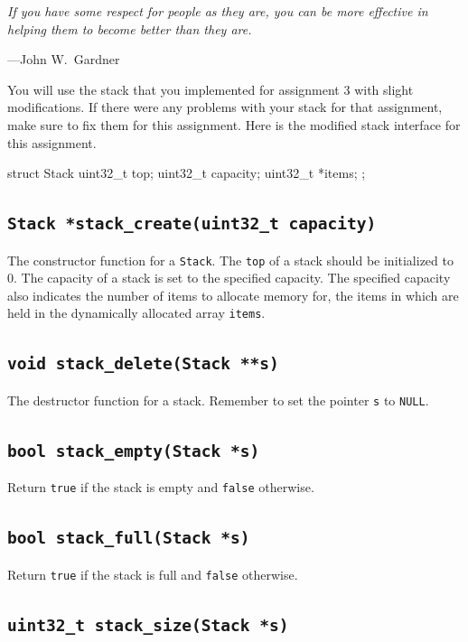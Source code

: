 \documentclass[11pt]{article}
\begin{document}
\textwidth \epigraph{\emph{If you have some respect
for people as they are, you can be more effective in helping them to
become better than they are.}}{---John W.\ Gardner}

You will use the stack that you implemented for assignment 3 with slight
modifications. If there were any problems with your stack for that
assignment, make sure to fix them for this assignment. Here is the
modified stack interface for this assignment.

\begin{codelisting}{}
struct Stack {
    uint32_t top;
    uint32_t capacity;
    uint32_t *items;
};
\end{codelisting}

\subsection{\texttt{Stack *stack\_create(uint32\_t capacity)}}

The constructor function for a \texttt{Stack}. The \texttt{top} of a
stack should be initialized to 0. The capacity of a stack is set to the
specified capacity. The specified capacity also indicates the number of
items to allocate memory for, the items in which are held in the
dynamically allocated array \texttt{items}.

\subsection{\texttt{void stack\_delete(Stack **s)}}

The destructor function for a stack. Remember to set the pointer
\texttt{s} to \texttt{NULL}.

\subsection{\texttt{bool stack\_empty(Stack *s)}}

Return \texttt{true} if the stack is empty and \texttt{false} otherwise.

\subsection{\texttt{bool stack\_full(Stack *s)}}

Return \texttt{true} if the stack is full and \texttt{false} otherwise.

\subsection{\texttt{uint32\_t stack\_size(Stack *s)}}
\end{document}
